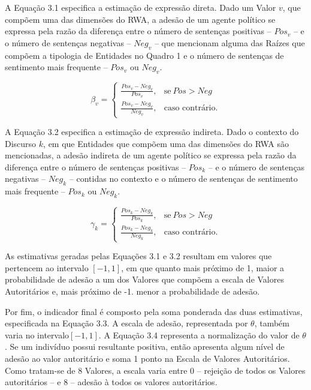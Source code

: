\documentclass[
12pt,				%
openright,			%
twoside,			%
a4paper,			%
english,			%
french,				%
spanish,			%
brazil				%
]{abntex2}
\begin{document}
A Equação 3.1 especifica a estimação de expressão direta. Dado um Valor $v$, que compõem uma das dimensões do RWA, a adesão de um agente político se expressa pela razão da diferença entre o número de sentenças positivas -- $Pos_v$ --  e o número de sentenças negativas -- $Neg_v$ -- que mencionam alguma das Raízes que compõem a tipologia de Entidades no Quadro 1 e o número de sentenças de sentimento mais frequente -- $Pos_v$ ou $Neg_v$.

\begin{equation}
\beta_v = 
\begin{cases}
\frac{Pos_v - Neg_v}{Pos_v}, & \text{se}\ Pos > Neg \\
\frac{Pos_v - Neg_v}{Neg_v}, & \text{caso contrário.}
\end{cases}
\end{equation}

A Equação 3.2 especifica a estimação de expressão indireta. Dado o contexto do Discurso $k$, em que Entidades que compõem uma das dimensões do RWA são mencionadas, a adesão indireta de um agente político se expressa pela razão da diferença entre o número de sentenças positivas -- $Pos_k$ --  e o número de sentenças negativas -- $Neg_k$ -- contidas no contexto e o número de sentenças de sentimento mais frequente -- $Pos_k$ ou $Neg_k$.

\begin{equation}
\gamma_k = 
\begin{cases}
\frac{Pos_k - Neg_k}{Pos_k}, & \text{se}\ Pos > Neg \\
\frac{Pos_k - Neg_k}{Neg_k}, & \text{caso contrário.}
\end{cases}
\end{equation}

As estimativas geradas pelas Equações 3.1 e 3.2 resultam em valores que pertencem ao intervalo $[-1, 1]$, em que quanto mais próximo de 1, maior a probabilidade de adesão a um dos Valores que compõem a escala de Valores Autoritários e, mais próximo de -1. menor a probabilidade de adesão. 

Por fim, o indicador final é composto pela soma ponderada das duas estimativas, especificada na Equação 3.3. A escala de adesão, representada por $\theta$, também varia no intervalo$[-1, 1]$. A Equação 3.4 representa a normalização do valor de $\theta$. Se um indivíduo possui resultante positiva, então apresenta algum nível de adesão ao valor autoritário e soma 1 ponto na Escala de Valores Autoritários. Como tratam-se de 8 Valores, a escala varia entre 0 -- rejeição de todos os Valores autoritários -- e 8 -- adesão à todos os valores autoritários.
\end{document}
